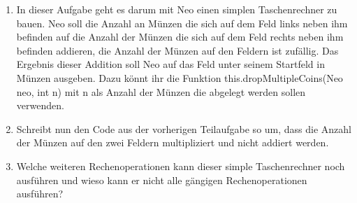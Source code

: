 
\begin{enumerate}
    \item In dieser Aufgabe geht es darum mit Neo einen simplen Taschenrechner zu bauen. Neo soll die Anzahl an Münzen die sich auf dem Feld links neben ihm befinden auf die Anzahl der Münzen die sich auf dem Feld rechts neben ihm befinden addieren, die Anzahl der Münzen auf den Feldern ist zufällig. Das Ergebnis dieser Addition soll Neo auf das Feld unter seinem Startfeld in Münzen ausgeben. Dazu könnt ihr die Funktion this.dropMultipleCoins(Neo neo, int n) mit n als Anzahl der Münzen die abgelegt werden sollen verwenden. 

    \item Schreibt nun den Code aus der vorherigen Teilaufgabe so um, dass die Anzahl der Münzen auf den zwei Feldern multipliziert und nicht addiert werden.
    
    \item Welche weiteren Rechenoperationen kann dieser simple Taschenrechner noch ausführen und wieso kann er nicht alle gängigen Rechenoperationen ausführen?
\end{enumerate}
